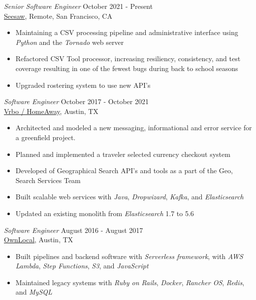 \documentclass[margin, 10pt]{res} %
\begin{document}
\begin{resume}
{\sl Senior Software Engineer} \hfill October 2021 - Present \\
\href{https://web.seesaw.me/}{Seesaw}, Remote, San Francisco, CA
\begin{itemize}
    \item Maintaining a CSV processing pipeline and administrative interface using {\it Python} and the {\it Tornado} web server
    \item Refactored CSV Tool processor, increasing resiliency, consistency, and test coverage resulting in one of the fewest bugs during back to school seasons
    \item Upgraded rostering system to use new API's
\end{itemize}

{\sl Software Engineer} \hfill October 2017 - October 2021 \\
\href{https://www.vrbo.com/}{Vrbo / HomeAway}, Austin, TX
\begin{itemize}
    \item Architected and modeled a new messaging, informational and error service for a greenfield project. 
    \item Planned and implemented a traveler selected currency checkout system
    \item Developed of Geographical Search API's and tools as a part of the Geo, Search Services Team
    \item Built scalable web services with {\it Java}, {\it Dropwizard}, {\it Kafka}, and {\it Elasticsearch}
    \item Updated an existing monolith from {\it Elasticsearch} 1.7 to 5.6
\end{itemize}


{\sl Software Engineer } \hfill August 2016 - August 2017 \\
\href{https://www.ownlocal.com}{OwnLocal}, Austin, TX
\begin{itemize}
    \item Built pipelines and backend software with {\it Serverless framework}, with {\it AWS Lambda}, {\it Step Functions}, {\it S3}, and {\it JavaScript}
    \item Maintained legacy systems with {\it Ruby on Rails}, {\it Docker}, {\it Rancher OS}, {\it Redis}, and {\it MySQL}
\end{itemize}


\end{resume}
\end{document}

